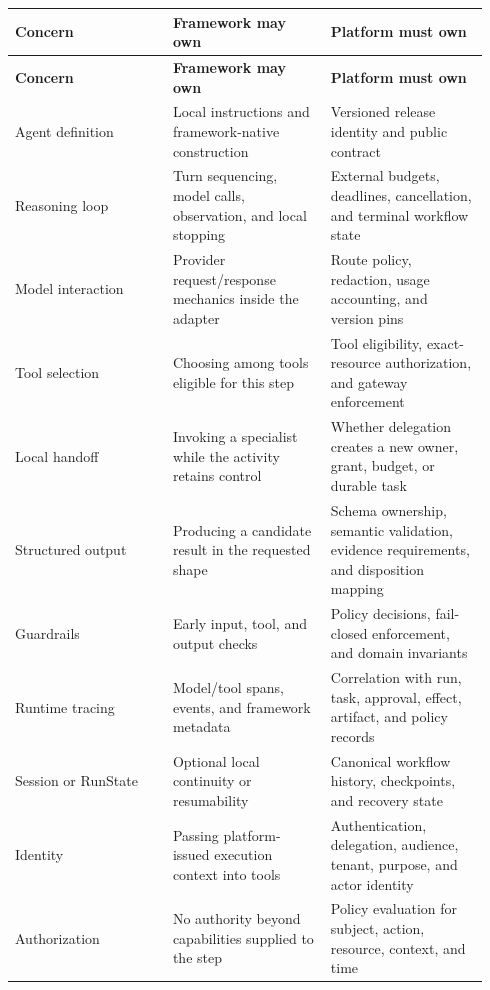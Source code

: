 \BookTableStart
\small
\begin{longtable}{@{}Y{0.3133\linewidth}Y{0.3133\linewidth}Y{0.3133\linewidth}@{}}
\color{white}\bfseries Concern & \color{white}\bfseries Framework may own & \color{white}\bfseries Platform must own \\
\endfirsthead
{}
\color{white}\bfseries Concern & \color{white}\bfseries Framework may own & \color{white}\bfseries Platform must own \\
\endhead
Agent definition & Local instructions and framework-native construction & Versioned release identity and public contract \\
Reasoning loop & Turn sequencing, model calls, observation, and local stopping & External budgets, deadlines, cancellation, and terminal workflow state \\
Model interaction & Provider request/response mechanics inside the adapter & Route policy, redaction, usage accounting, and version pins \\
Tool selection & Choosing among tools eligible for this step & Tool eligibility, exact-resource authorization, and gateway enforcement \\
Local handoff & Invoking a specialist while the activity retains control & Whether delegation creates a new owner, grant, budget, or durable task \\
Structured output & Producing a candidate result in the requested shape & Schema ownership, semantic validation, evidence requirements, and disposition mapping \\
Guardrails & Early input, tool, and output checks & Policy decisions, fail-closed enforcement, and domain invariants \\
Runtime tracing & Model/tool spans, events, and framework metadata & Correlation with run, task, approval, effect, artifact, and policy records \\
Session or RunState & Optional local continuity or resumability & Canonical workflow history, checkpoints, and recovery state \\
Identity & Passing platform-issued execution context into tools & Authentication, delegation, audience, tenant, purpose, and actor identity \\
Authorization & No authority beyond capabilities supplied to the step & Policy evaluation for subject, action, resource, context, and time \\

\end{longtable}
